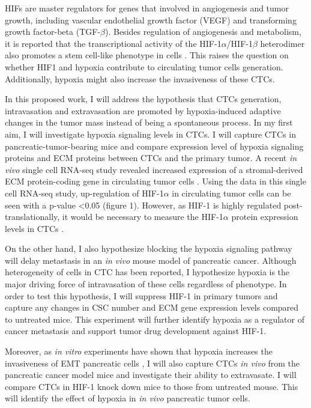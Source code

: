 \documentclass[11pts]{article}
\begin{document}
\noindent HIFs are master regulators for genes that involved in angiogenesis and tumor growth, including vascular endothelial growth factor (VEGF) and transforming growth factor-beta (TGF-$\beta$). Besides regulation of angiogenesis and metabolism, it is reported that the transcriptional activity of the HIF-1$\alpha$/HIF-1$\beta$ heterodimer also promotes a stem cell-like phenotype in cells \cite{Noman:2014qf,10.1172/JCI67230}. This raises the question on whether HIF1 and hypoxia contribute to circulating tumor cells generation. Additionally, hypoxia might also increase the invasiveness of these CTCs. 
\newline

\newline
\noindent In this proposed work, I will address the hypothesis that CTCs generation, intravasation and extravasation are promoted by hypoxia-induced adaptive changes in the tumor mass instead of being a spontaneous process. In my first aim, I will investigate hypoxia signaling levels in CTCs. I will capture CTCs in pancreatic-tumor-bearing mice and compare expression level of hypoxia signaling proteins and ECM proteins between CTCs and the primary tumor. A recent {\it in vivo} single cell RNA-seq study revealed increased expression of a stromal-derived ECM protein-coding gene in circulating tumor cells \cite{Ting:zl}. Using the data in this single cell RNA-seq study, up-regulation of HIF-1$\alpha$ in circulating tumor cells can be seen with a p-value \textless 0.05 (figure 1). However, as HIF-1 is highly regulated post-translationally, it would be necessary to measure the HIF-1$\alpha$ protein expression levels in CTCs \cite{Wenger:1997fk}.
 \newline

\noindent On the other hand, I also hypothesize blocking the hypoxia signaling pathway will delay metastasis in an {\it in vivo} mouse model of pancreatic cancer. Although heterogeneity of cells in CTC has been reported, I hypothesize hypoxia is the major driving force of intravasation of these cells regardless of phenotype. In order to test this hypothesis, I will suppress HIF-1 in primary tumors and capture any changes in CSC number and ECM gene expression levels compared to untreated mice. This experiment will further identify hypoxia as a regulator of cancer metastasis and support tumor drug development against HIF-1.
 \newline

\noindent Moreover, as {\it in vitro} experiments have shown that hypoxia increases the invasiveness of EMT pancreatic cells \cite{10.1371/journal.pone.0046391}, I will also capture CTCs {\it in vivo} from the pancreatic cancer model mice and investigate their ability to extravasate. I will compare CTCs in HIF-1 knock down mice to those from untreated mouse. This will identify the effect of hypoxia in {\it in vivo} pancreatic tumor cells. 
 \newline
\end{document}
